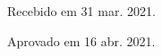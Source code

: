 \begin{refsection}
    \nocite{Spinelli2010Coroneis}

    \printbibliography[heading=subbibliography,notcategory=fullcited]

    \hfill Recebido em 31 mar. 2021.

    \hfill Aprovado em 16 abr. 2021.

    \label{chap:comemorarend}

\end{refsection}
